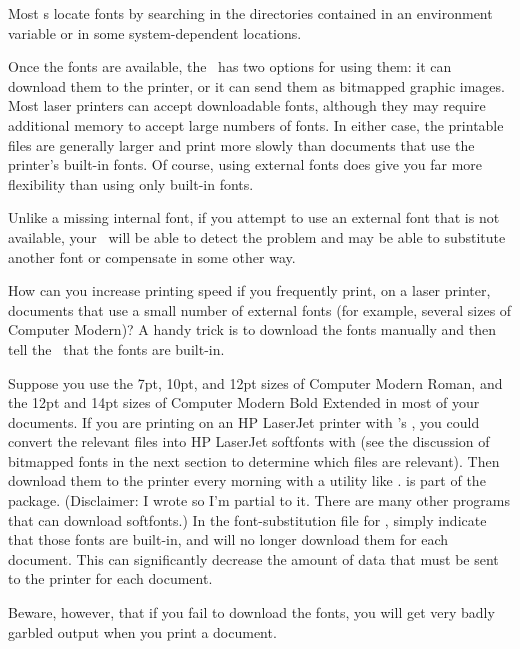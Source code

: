 Most \dvidriver{}s locate fonts by searching in the directories contained
in an environment variable or in some system-dependent locations.  

Once the fonts are available, the \dvidriver\ has two options for
using them: it can download them to the printer, or it can send them as
bitmapped graphic images.  Most laser printers can accept downloadable
fonts, although they may require additional memory to accept large
numbers of fonts.  In either case, the printable files are generally
larger and print more slowly than documents that use the printer's
built-in fonts.  Of course, using external fonts does give you far
more flexibility than using only built-in fonts.

Unlike a missing internal font, if you attempt to use an external font
that is not available, your \dvidriver\ will be able to detect the
problem and may be able to substitute another font or compensate in
some other way.

\begin{sidebar}

How can you increase printing speed if 
you frequently print, on a laser printer,
documents that use a small number of external fonts
(for example, several sizes of Computer Modern)?  A handy trick is to 
download the
fonts manually and then tell the \dvidriver\ that the fonts are
built-in.  

Suppose you use the 7pt, 10pt, and 12pt sizes of
Computer Modern Roman, and the 12pt and 14pt sizes of Computer Modern
Bold Extended in most of your documents.  If you are printing on an HP
LaserJet printer with \emTeX's , you could convert
the relevant  files  into HP LaserJet softfonts with  (see the discussion of bitmapped fonts in
the next section to determine which  
files are relevant).
Then download them to the printer every morning with a utility like
.   is part of the 
package. (Disclaimer: I wrote  so I'm partial to it.
There are many other programs that can download softfonts.)  In the
font-substitution file for , simply indicate that
those fonts are built-in,
and  will no longer download
them for each document.  This can significantly decrease the amount of
data that must be sent to the printer for each document.

Beware, however, that if you fail to download the fonts, you will
get very badly garbled output when you print a document.
\end{sidebar}

